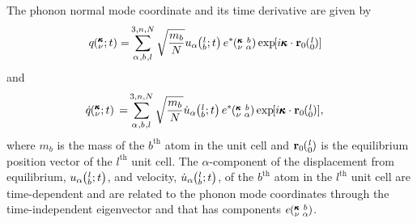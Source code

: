 \documentclass[letterpaper,12pt]{article}
\newcommand{\EXP}[1]{\exp\mspace{-5.0mu}\left[#1\right]\mspace{-3.0mu}}
\newcommand{\SUM}[2]{\ifthenelse{\equal{#1}{0}}{\sum_{\alpha_{#2},b_{#2},l_{#2}}^{3,n,N}} {\ifthenelse{\equal{#1}{1}}{\sum_{\alpha_{#2},b_{#2}}^{3,n}}{\sum_{\pmb{\kappa}#2,\nu#2}^{N,3n}}}}
\newcommand{\ab}[2]{\mspace{-4.0mu}\left(\mspace{-8.0mu}\begin{smallmatrix}&\ifthenelse{\equal{#1}{}}{a}{#1} \\&\ifthenelse{\equal{#2}{}}{b}{#2}\end{smallmatrix}\mspace{-3.0mu}\right)}
\newcommand{\kvba}{\mspace{-4.0mu}\left(\mspace{-8.0mu}\begin{smallmatrix} &\pmb{\kappa} &b \\ &\nu &\alpha\end{smallmatrix}\mspace{-3.0mu}\right)}
\newcommand{\kvt}{\mspace{-4.0mu}\left(\mspace{-8.0mu}\begin{smallmatrix}&\pmb{\kappa} \\&\nu\end{smallmatrix}\mspace{-2.0mu};t\right)}
\newcommand{\lbt}{\mspace{-4.0mu}\left(\mspace{-8.0mu}\begin{smallmatrix}&l \\&b\end{smallmatrix}\mspace{-2.0mu};t\right)}
\begin{document}
  The
phonon normal mode coordinate\cite{dove1993} and its time derivative are given by
\begin{equation}\label{E:q_HLD}
\begin{split}
q\kvt=&\SUM{0}{}\sqrt{\frac{m_b}{N}}u_{\alpha}\lbt e^*\kvba\EXP{i\pmb{\kappa}\cdot\mathbf{r}_0\ab{l}{0}}
\end{split}
\end{equation}
and
\begin{equation}\label{E:qdot_HLD}
\begin{split}
\dot{q}\kvt{}{}{}=&\SUM{0}{}\sqrt{\frac{m_b}{N}}\dot{u}_{\alpha}\lbt e^*\kvba\EXP{i\pmb{\kappa}\cdot\mathbf{r}_0\ab{l}{0}},
\end{split}
\end{equation}
where $m_b$ is the mass of the $b^{\textrm{th}}$ atom in the unit cell and
$\mathbf{r}_0\ab{l}{0}$ is the equilibrium position vector of the
$l^{\textrm{th}}$ unit cell. The $\alpha$-component of the displacement from
equilibrium, $u_{\alpha}\lbt$, and velocity, $\dot{u}_{\alpha}\lbt$, of the
$b^{\textrm{th}}$ atom in the $l^{\textrm{th}}$ unit cell are time-dependent
and are related to the phonon mode coordinates through the time-independent
eigenvector and that has components $e\kvba$.\cite{dove1993}
\end{document}
